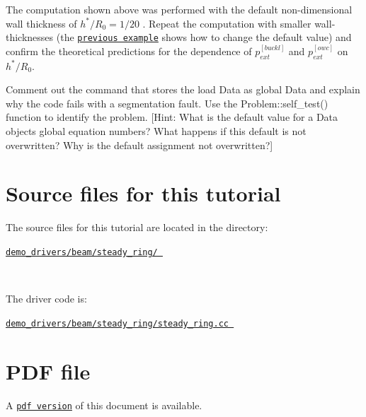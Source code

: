 \begin{DoxyEnumerate}
\item The computation shown above was performed with the default non-\/dimensional wall thickness of $ h^*/R_0 = 1/20 $ . Repeat the computation with smaller wall-\/thicknesses (the \href{../../tensioned_string/html/index.html}{\tt previous example} shows how to change the default value) and confirm the theoretical predictions for the dependence of $ p_{ext}^{[buckl]} $ and $ p_{ext}^{[owc]} $ on $ h^*/R_0 $. ~\newline
~\newline

\item Comment out the command that stores the load {\ttfamily Data} as global {\ttfamily Data} and explain why the code fails with a segmentation fault. Use the {\ttfamily Problem\+::self\+\_\+test()} function to identify the problem. \mbox{[}Hint\+: What is the default value for a {\ttfamily Data} object\textquotesingle{}s global equation numbers? What happens if this default is not overwritten? Why is the default assignment not overwritten?\mbox{]}
\end{DoxyEnumerate}



 

\hypertarget{index_sources}{}\section{Source files for this tutorial}\label{index_sources}

\begin{DoxyItemize}
\item The source files for this tutorial are located in the directory\+:~\newline
~\newline
\begin{center} \href{
../../../../
demo_drivers/beam/steady_ring/
}{\tt demo\+\_\+drivers/beam/steady\+\_\+ring/ } \end{center} ~\newline

\item The driver code is\+: ~\newline
~\newline
\begin{center} \href{
../../../../
demo_drivers/beam/steady_ring/steady_ring.cc
}{\tt demo\+\_\+drivers/beam/steady\+\_\+ring/steady\+\_\+ring.\+cc } \end{center} 
\end{DoxyItemize}



 

 \hypertarget{index_pdf}{}\section{P\+D\+F file}\label{index_pdf}
A \href{../latex/refman.pdf}{\tt pdf version} of this document is available. 
